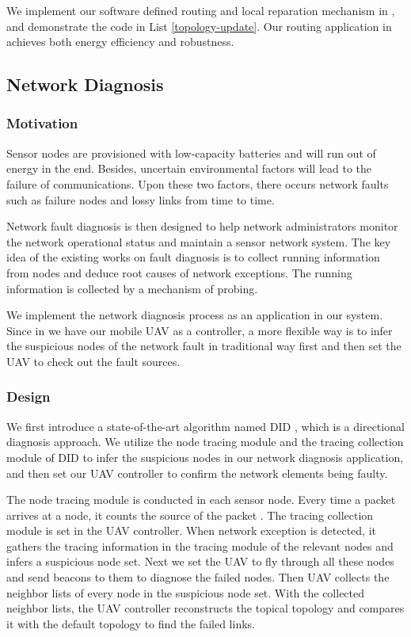 We implement our software defined routing and 
local reparation mechanism in {\sdn}, 
and demonstrate the code in List \ref{topology-update}. 
Our routing application in {\sdn} achieves both energy efficiency and robustness.


\subsection{Network Diagnosis}

\subsubsection{Motivation}

Sensor nodes are provisioned with low-capacity batteries and will run out of energy in the end. 
Besides, uncertain environmental factors will lead to the failure of communications.
Upon these two factors, there occurs network faults such as failure nodes and lossy links from time to time.

Network fault diagnosis is then designed to help network administrators monitor the network 
operational status and maintain a sensor network system. The key idea of the existing works
on fault diagnosis is to collect running information from nodes and deduce root causes of network
exceptions. The running information is collected by a mechanism of probing.

We implement the network diagnosis process as an application in our {\sdn} system.
Since in {\sdn} we have our mobile UAV as a controller, a more flexible way is to infer the suspicious 
nodes of the network fault in traditional way first and then set the UAV to check out the fault sources. 
 
\subsubsection{Design}

We first introduce a state-of-the-art algorithm named DID 
\cite{gong2015directional}, which is a directional diagnosis approach.
We utilize the node tracing module and the tracing collection module of DID
to infer the suspicious nodes in our network diagnosis application, 
and then set our UAV controller to confirm the network elements being faulty.

The node tracing module is conducted in each sensor node. 
Every time a packet arrives at a node, it counts
the source of the packet . The tracing collection module
is set in the UAV controller. When network exception is detected, 
it gathers the tracing information in the tracing module of the relevant nodes
and infers a suspicious node set. Next we set the UAV to fly through all these nodes 
and send beacons to them to diagnose the failed nodes. 
Then UAV collects the neighbor lists of every node in the suspicious node set.
With the collected neighbor lists, the UAV controller reconstructs the topical topology and 
compares it with the default topology to find the failed links.

